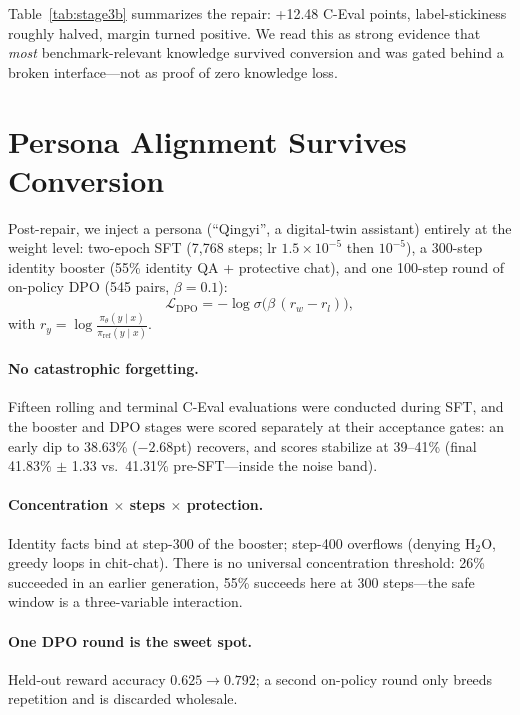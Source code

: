 \documentclass[11pt]{article}
\begin{document}
Table~\ref{tab:stage3b} summarizes the repair: +12.48 C-Eval points,
label-stickiness roughly halved, margin turned positive. We read this as
strong evidence that \emph{most} benchmark-relevant knowledge survived
conversion and was gated behind a broken interface---not as proof of
zero knowledge loss.

\section{Persona Alignment Survives Conversion}
\label{sec:persona}

Post-repair, we inject a persona (``Qingyi'', a digital-twin assistant)
entirely at the weight level: two-epoch SFT (7{,}768 steps; lr $1.5{\times}10^{-5}$
then $10^{-5}$), a 300-step identity booster (55\% identity QA +
protective chat), and one 100-step round of on-policy DPO
\citep{rafailov2023dpo} (545 pairs, $\beta{=}0.1$):
\begin{equation}
\mathcal{L}_{\mathrm{DPO}} = -\log \sigma\bigl(\beta\,(r_w - r_l)\bigr),
\label{eq:dpo}
\end{equation}
with $r_y = \log \frac{\pi_\theta(y \mid x)}{\pi_{\mathrm{ref}}(y \mid x)}$.

\paragraph{No catastrophic forgetting.}
Fifteen rolling and terminal C-Eval evaluations were conducted during
SFT, and the booster and DPO stages were scored separately at their
acceptance gates: an early dip to 38.63\% ($-2.68$pt) recovers, and
scores stabilize at 39--41\% (final 41.83\% $\pm$ 1.33 vs.\ 41.31\%
pre-SFT---inside the noise band).

\paragraph{Concentration $\times$ steps $\times$ protection.}
Identity facts bind at step-300 of the booster; step-400 overflows
(denying H$_2$O, greedy loops in chit-chat). There is no universal
concentration threshold: 26\% succeeded in an earlier generation, 55\%
succeeds here at 300 steps---the safe window is a three-variable
interaction.

\paragraph{One DPO round is the sweet spot.}
Held-out reward accuracy $0.625 \to 0.792$; a second on-policy round
only breeds repetition and is discarded wholesale.
\end{document}
